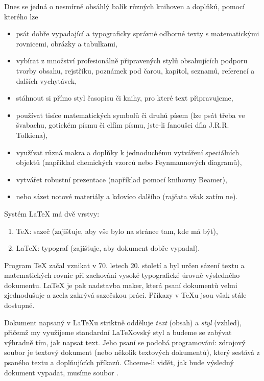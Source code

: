 \documentclass[a4paper,11pt,twoside]{article}
\theoremstyle{red}
\theoremstyle{green}
\begin{document}
    Dnes se jedná o nesmírně obsáhlý balík různých knihoven a doplňků, pomocí kterého lze
    \begin{itemize}
        \item psát dobře vypadající a typograficky správné odborné texty s matematickými rovnicemi, obrázky a tabulkami,
        \item vybírat z množství profesionálně připravených stylů obsahujících podporu tvorby obsahu, rejstříku, poznámek pod čarou, kapitol, seznamů, referencí a dalších vychytávek,
        \item stáhnout si přímo styl časopisu či knihy, pro které text připravujeme, 
        \item používat tisíce matematických symbolů či druhů písem (lze psát třeba ve švabachu, gotickém písmu či elfím písmu, jste-li fanoušci díla J.R.R. Tolkiena),
        \item využívat různá makra a doplňky k jednoduchému vytváření speciálních objektů (například chemických vzorců nebo Feynmannových diagramů),
        \item vytvářet robustní prezentace (například pomocí knihovny Beamer),
        \item nebo sázet notové materiály a kdovíco dalšího (rajčata však zatím ne).
    \end{itemize}

    Systém \LaTeX{} má dvě vrstvy:
    \begin{enumerate}
        \item \TeX{}: sazeč (zajišťuje, aby vše bylo na stránce tam, kde má být),
        \item \LaTeX{}: typograf (zajišťuje, aby dokument dobře vypadal).
    \end{enumerate}
    Program \TeX{} začal vznikat v 70. letech 20. století a byl určen sázení textu a matematických rovnic při zachování vysoké typografické úrovně výsledného dokumentu.
    \LaTeX{} je pak nadstavba maker, která psaní dokumentů velmi zjednodušuje a zcela zakrývá sazečskou práci. 
    Příkazy v \TeX{}u jsou však stále dostupné.

    Dokument napsaný v \LaTeX{}u striktně odděluje \emph{text} (obsah) a \emph{styl} (vzhled), přičemž my využijeme standardní \LaTeX{}ovský styl a budeme se zabývat výhradně tím, jak napsat text.
    Jeho psaní se podobá programování: zdrojový soubor je textový dokument (nebo několik textových dokumentů), který sestává z psaného textu a doplňujících příkazů.
    Chceme-li vidět, jak bude výsledný dokument vypadat, musíme soubor .
\end{document}
